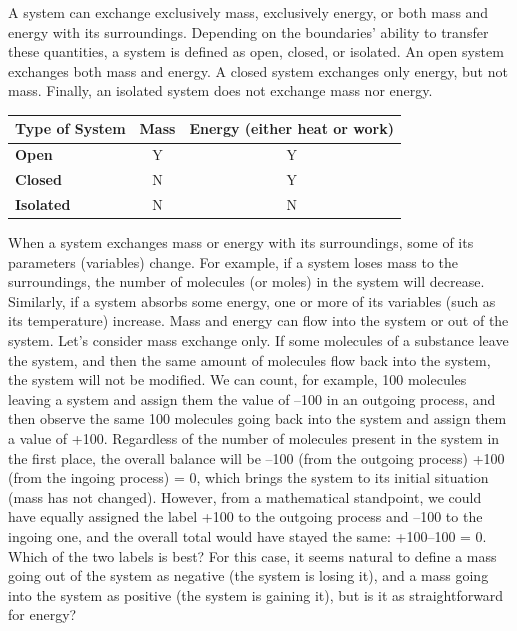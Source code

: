 \documentclass[
]{book}
\theoremstyle{definition}
\theoremstyle{definition}
\theoremstyle{definition}
\theoremstyle{remark}
\begin{document}
A system can exchange exclusively mass, exclusively energy, or both mass and energy with its surroundings. Depending on the boundaries' ability to transfer these quantities, a system is defined as open, closed, or isolated. An open system exchanges both mass and energy. A closed system exchanges only energy, but not mass. Finally, an isolated system does not exchange mass nor energy.

\begin{longtable}[]{@{}lcc@{}}
\toprule
\textbf{Type of System} & \textbf{Mass} & \textbf{Energy} (either heat or work)\tabularnewline
\midrule
\endhead
\textbf{Open} & Y & Y\tabularnewline
\textbf{Closed} & N & Y\tabularnewline
\textbf{Isolated} & N & N\tabularnewline
\bottomrule
\end{longtable}

When a system exchanges mass or energy with its surroundings, some of its parameters (variables) change. For example, if a system loses mass to the surroundings, the number of molecules (or moles) in the system will decrease. Similarly, if a system absorbs some energy, one or more of its variables (such as its temperature) increase. Mass and energy can flow into the system or out of the system. Let's consider mass exchange only. If some molecules of a substance leave the system, and then the same amount of molecules flow back into the system, the system will not be modified. We can count, for example, 100 molecules leaving a system and assign them the value of --100 in an outgoing process, and then observe the same 100 molecules going back into the system and assign them a value of +100. Regardless of the number of molecules present in the system in the first place, the overall balance will be --100 (from the outgoing process) +100 (from the ingoing process) = 0, which brings the system to its initial situation (mass has not changed). However, from a mathematical standpoint, we could have equally assigned the label +100 to the outgoing process and --100 to the ingoing one, and the overall total would have stayed the same: +100--100 = 0. Which of the two labels is best? For this case, it seems natural to define a mass going out of the system as negative (the system is losing it), and a mass going into the system as positive (the system is gaining it), but is it as straightforward for energy?
\end{document}
